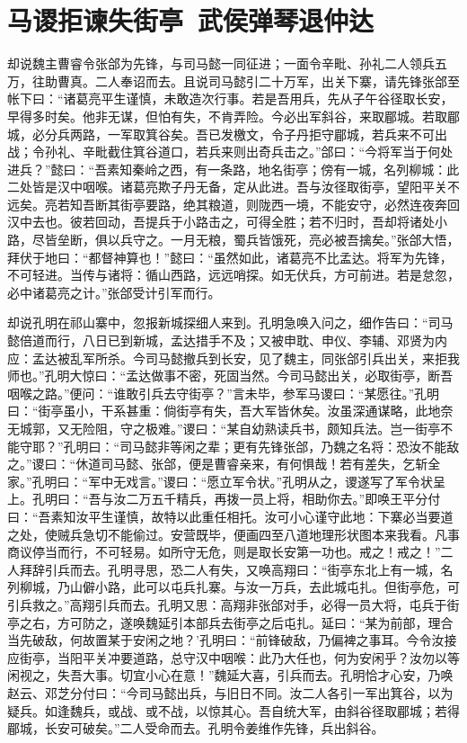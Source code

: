 \chapter{马谡拒谏失街亭~武侯弹琴退仲达}

却说魏主曹睿令张郃为先锋，与司马懿一同征进；一面令辛毗、孙礼二人领兵五万，往助曹真。二人奉诏而去。且说司马懿引二十万军，出关下寨，请先锋张郃至帐下曰：“诸葛亮平生谨慎，未敢造次行事。若是吾用兵，先从子午谷径取长安，早得多时矣。他非无谋，但怕有失，不肯弄险。今必出军斜谷，来取郿城。若取郿城，必分兵两路，一军取箕谷矣。吾已发檄文，令子丹拒守郿城，若兵来不可出战；令孙礼、辛毗截住箕谷道口，若兵来则出奇兵击之。”郃曰：“今将军当于何处进兵？”懿曰：“吾素知秦岭之西，有一条路，地名街亭；傍有一城，名列柳城：此二处皆是汉中咽喉。诸葛亮欺子丹无备，定从此进。吾与汝径取街亭，望阳平关不远矣。亮若知吾断其街亭要路，绝其粮道，则陇西一境，不能安守，必然连夜奔回汉中去也。彼若回动，吾提兵于小路击之，可得全胜；若不归时，吾却将诸处小路，尽皆垒断，俱以兵守之。一月无粮，蜀兵皆饿死，亮必被吾擒矣。”张郃大悟，拜伏于地曰：“都督神算也！”懿曰：“虽然如此，诸葛亮不比孟达。将军为先锋，不可轻进。当传与诸将：循山西路，远远哨探。如无伏兵，方可前进。若是怠忽，必中诸葛亮之计。”张郃受计引军而行。

却说孔明在祁山寨中，忽报新城探细人来到。孔明急唤入问之，细作告曰：“司马懿倍道而行，八日已到新城，孟达措手不及；又被申耽、申仪、李辅、邓贤为内应：孟达被乱军所杀。今司马懿撤兵到长安，见了魏主，同张郃引兵出关，来拒我师也。”孔明大惊曰：“孟达做事不密，死固当然。今司马懿出关，必取街亭，断吾咽喉之路。”便问：“谁敢引兵去守街亭？”言未毕，参军马谡曰：“某愿往。”孔明曰：“街亭虽小，干系甚重：倘街亭有失，吾大军皆休矣。汝虽深通谋略，此地奈无城郭，又无险阻，守之极难。”谡曰：“某自幼熟读兵书，颇知兵法。岂一街亭不能守耶？”孔明曰：“司马懿非等闲之辈；更有先锋张郃，乃魏之名将：恐汝不能敌之。”谡曰：“休道司马懿、张郃，便是曹睿亲来，有何惧哉！若有差失，乞斩全家。”孔明曰：“军中无戏言。”谡曰：“愿立军令状。”孔明从之，谡遂写了军令状呈上。孔明曰：“吾与汝二万五千精兵，再拨一员上将，相助你去。”即唤王平分付曰：“吾素知汝平生谨慎，故特以此重任相托。汝可小心谨守此地：下寨必当要道之处，使贼兵急切不能偷过。安营既毕，便画四至八道地理形状图本来我看。凡事商议停当而行，不可轻易。如所守无危，则是取长安第一功也。戒之！戒之！”二人拜辞引兵而去。孔明寻思，恐二人有失，又唤高翔曰：“街亭东北上有一城，名列柳城，乃山僻小路，此可以屯兵扎寨。与汝一万兵，去此城屯扎。但街亭危，可引兵救之。”高翔引兵而去。孔明又思：高翔非张郃对手，必得一员大将，屯兵于街亭之右，方可防之，遂唤魏延引本部兵去街亭之后屯扎。延曰：“某为前部，理合当先破敌，何故置某于安闲之地？’孔明曰：“前锋破敌，乃偏裨之事耳。今令汝接应街亭，当阳平关冲要道路，总守汉中咽喉：此乃大任也，何为安闲乎？汝勿以等闲视之，失吾大事。切宜小心在意！”魏延大喜，引兵而去。孔明恰才心安，乃唤赵云、邓芝分付曰：“今司马懿出兵，与旧日不同。汝二人各引一军出箕谷，以为疑兵。如逢魏兵，或战、或不战，以惊其心。吾自统大军，由斜谷径取郿城；若得郿城，长安可破矣。”二人受命而去。孔明令姜维作先锋，兵出斜谷。

